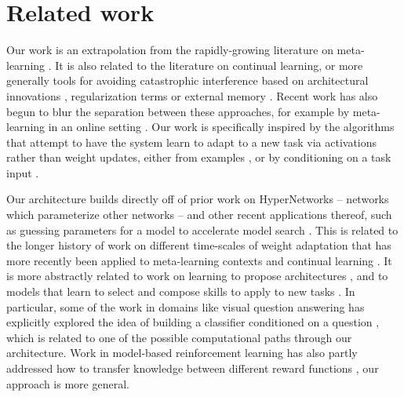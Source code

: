\documentclass{article}
\begin{document}
\section{Related work}
Our work is an extrapolation from the rapidly-growing literature on meta-learning \citep[e.g.][]{Vinyals2016, Santoro2016, Finn2017a, Finn2018, Stadie2018}. It is also related to the literature on continual learning, or more generally tools for avoiding catastrophic interference based on architectural innovations \citep[e.g.][]{Fernando2017, Rusu2016}, regularization terms \citep[e.g.][]{Kirkpatrick2016, Zenke2017, Aljundi2019} or external memory \citep[e.g.][]{Sprechmann2018}. Recent work has also begun to blur the separation between these approaches, for example by meta-learning in an online setting \citep{Finn2019}. Our work is specifically inspired by the algorithms that attempt to have the system learn to adapt to a new task via activations rather than weight updates, either from examples \citep[e.g.][]{Wang2016a, Duan2016}, or by conditioning on a task input \citep[e.g.][]{Borsa2019}. \par
Our architecture builds directly off of prior work on HyperNetworks \citep{Ha2016} -- networks which parameterize other networks -- and other recent applications thereof, such as guessing parameters for a model to accelerate model search \citep[e.g.]{Brock2018a, Zhang2019}. This is related to the longer history of work on different time-scales of weight adaptation \citep{Hinton1982, Kumaran2016} that has more recently been applied to meta-learning contexts \citep[e.g.][]{Ba2016, Munkhdalai2017} and continual learning \citep[e.g.]{Hu2019}. It is more abstractly related to work on learning to propose architectures \citep[e.g.][]{Zoph2016, Cao2019}, and to models that learn to select and compose skills to apply to new tasks \citep[e.g.][]{Andreas, Andreas2016, Tessler2016, Reed2015}. In particular, some of the work in domains like visual question answering has explicitly explored the idea of building a classifier conditioned on a question \citep{Andreas, Andreasa}, which is related to one of the possible computational paths through our architecture. Work in model-based reinforcement learning has also partly addressed how to transfer knowledge between different reward functions \citep[e.g.][]{Laroche2017}, our approach is more general. \par 
\end{document}
